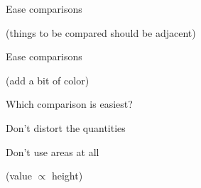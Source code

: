 \documentclass[aspectratio=169,12pt,t]{beamer}
\begin{document}
\begin{frame}{Ease comparisons}

\hilit (things to be compared should be adjacent)

\bigskip


\note{
}
\end{frame}





\begin{frame}{Ease comparisons}

\hilit (add a bit of color)

\bigskip


\note{
}
\end{frame}




\begin{frame}[c]{Which comparison is easiest?}


\note{
}
\end{frame}


\begin{frame}{Don't distort the quantities}

{\hilit
}

\bigskip


\note{
}
\end{frame}



\begin{frame}{Don't use areas at all}

{\hilit
  (value $\propto$ height)
}

\bigskip


\note{
}
\end{frame}
\end{document}
